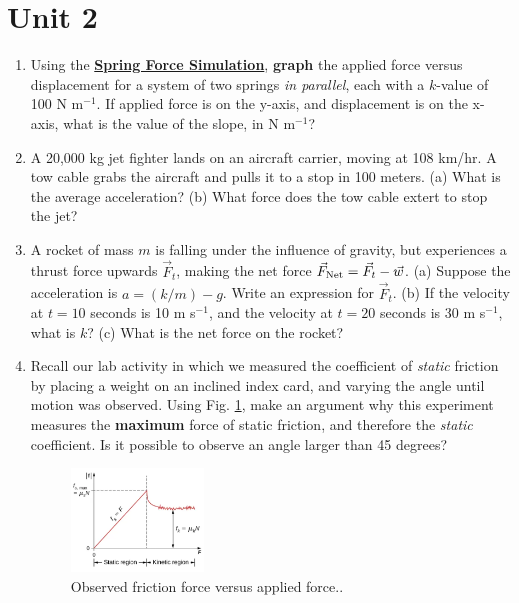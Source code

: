 \documentclass{article}
\begin{document}
\section{Unit 2}

\begin{enumerate}
\item Using the \textbf{\href{https://phet.colorado.edu/en/simulations/hookes-law}{Spring Force Simulation}}, \textbf{graph} the applied force versus displacement for a system of two springs \textit{in parallel}, each with a $k$-value of 100 N m$^{-1}$.  If applied force is on the y-axis, and displacement is on the x-axis, what is the value of the slope, in N m$^{-1}$? \\ \vspace{3cm}

\item A 20,000 kg jet fighter lands on an aircraft carrier, moving at 108 km/hr. A tow cable grabs the aircraft and pulls it to a stop in 100 meters. (a) What is the average acceleration? (b) What force does the tow cable extert to stop the jet? \\ \vspace{3cm}

\item A rocket of mass $m$ is falling under the influence of gravity, but experiences a thrust force upwards $\vec{F}_t$, making the net force $\vec{F}_{\rm Net} = \vec{F}_t-\vec{w}$.  (a) Suppose the acceleration is $a = (k/m) - g$.  Write an expression for $\vec{F}_t$. (b) If the velocity at $t=10$ seconds is 10 m s$^{-1}$, and the velocity at $t=20$ seconds is 30 m s$^{-1}$, what is $k$? (c) What is the net force on the rocket? \\ \vspace{4cm}

\item Recall our lab activity in which we measured the coefficient of \textit{static} friction by placing a weight on an inclined index card, and varying the angle until motion was observed.  Using Fig. \ref{fig:3}, make an argument why this experiment measures the \textbf{maximum} force of static friction, and therefore the \textit{static} coefficient.  Is it possible to observe an angle larger than 45 degrees?

\begin{figure}
\centering
\includegraphics[width=0.333\textwidth]{friction_diagram.png}
\caption{\label{fig:3} Observed friction force versus applied force..}
\end{figure}


\end{enumerate}
\end{document}
